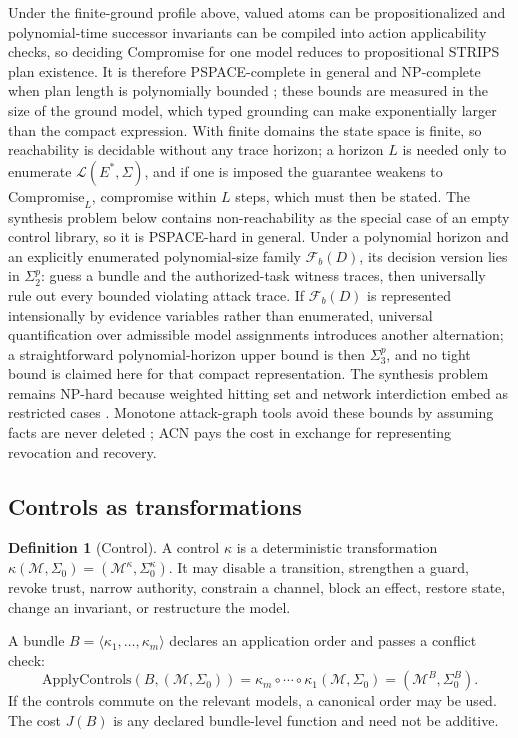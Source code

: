 \documentclass[11pt,letterpaper]{article}
\theoremstyle{definition}
\newtheorem{definition}{Definition}
\newcommand{\St}{\Sigma}
\newcommand{\Lang}{\mathcal{L}}
\newcommand{\Fam}{\mathcal{F}}
\newcommand{\Mod}{\mathcal{M}}
\newcommand{\Comp}{\mathrm{Compromise}}
\begin{document}
Under the finite-ground profile above, valued atoms can be propositionalized and polynomial-time successor invariants can be compiled into action applicability checks, so deciding $\Comp$ for one model reduces to propositional STRIPS plan existence. It is therefore PSPACE-complete in general and NP-complete when plan length is polynomially bounded \cite{bylander1994}; these bounds are measured in the size of the ground model, which typed grounding can make exponentially larger than the compact expression. With finite domains the state space is finite, so reachability is decidable without any trace horizon; a horizon $L$ is needed only to enumerate $\Lang(E^{*},\St)$, and if one is imposed the guarantee weakens to $\Comp_L$, compromise within $L$ steps, which must then be stated. The synthesis problem below contains non-reachability as the special case of an empty control library, so it is PSPACE-hard in general. Under a polynomial horizon and an explicitly enumerated polynomial-size family $\Fam_b(D)$, its decision version lies in $\Sigma_2^{p}$: guess a bundle and the authorized-task witness traces, then universally rule out every bounded violating attack trace. If $\Fam_b(D)$ is represented intensionally by evidence variables rather than enumerated, universal quantification over admissible model assignments introduces another alternation; a straightforward polynomial-horizon upper bound is then $\Sigma_3^{p}$, and no tight bound is claimed here for that compact representation. The synthesis problem remains NP-hard because weighted hitting set and network interdiction embed as restricted cases \cite{nandi2016,bhuiyan2021}. Monotone attack-graph tools avoid these bounds by assuming facts are never deleted \cite{ammann2002,mulval}; ACN pays the cost in exchange for representing revocation and recovery.

\subsection{Controls as transformations}

\begin{definition}[Control]\label{def:control}
A control $\kappa$ is a deterministic transformation $\kappa(\Mod,\St_0)=(\Mod^{\kappa},\St_0^{\kappa})$. It may disable a transition, strengthen a guard, revoke trust, narrow authority, constrain a channel, block an effect, restore state, change an invariant, or restructure the model.
\end{definition}
A bundle $B=\langle\kappa_1,\dots,\kappa_m\rangle$ declares an application order and passes a conflict check:
\begin{equation}\label{eq:bundle}
\mathrm{ApplyControls}(B,(\Mod,\St_0))=\kappa_m\circ\cdots\circ\kappa_1(\Mod,\St_0)=(\Mod^{B},\St_0^{B}).
\end{equation}
If the controls commute on the relevant models, a canonical order may be used. The cost $J(B)$ is any declared bundle-level function and need not be additive.
\end{document}

